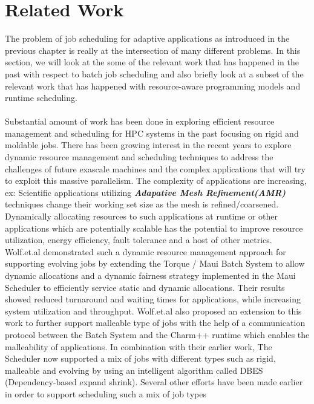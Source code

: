 \chapter{Related Work}\label{chapter:related work}
The problem of job scheduling for adaptive applications as introduced in the previous chapter is really at the intersection of many different problems. In this section, we will look at the some of the relevant work that has happened in the past with respect to batch job scheduling and also briefly look at a subset of the relevant work that has happened with resource-aware programming models and runtime scheduling.\\ \\
Substantial amount of work has been done in exploring efficient resource management and scheduling for HPC systems in the past focusing on rigid and moldable jobs. There has been growing interest in the recent years to explore dynamic resource management and scheduling techniques to address the challenges of future exascale machines and the complex applications that will try to exploit this massive parallelism. The complexity of applications are increasing, ex: Scientific applications utilizing \textbf{\textit{Adapative Mesh Refinement(AMR)}} techniques change their working set size as the mesh is refined/coarsened. Dynamically allocating resources to such applications at runtime or other applications which are potentially scalable has the potential to improve resource utilization, energy efficiency, fault tolerance\cite{vadhiyar} and a host of other metrics\cite{abhishek}\cite{osman}. Wolf.et.al\cite{felix} demonstrated such a dynamic resource management approach for supporting evolving jobs by extending the Torque / Maui Batch System to allow dynamic allocations and a dynamic fairness strategy implemented in the Maui Scheduler to efficiently service static and dynamic allocations. Their results showed reduced turnaround and waiting times for applications, while increasing system utilization and throughput. Wolf.et.al\cite{laxmikant} also proposed an extension to this work to further support malleable type of jobs with the help of a communication protocol between the Batch System and the Charm++ runtime which enables the malleability of applications. In combination with their earlier work, The Scheduler now supported a mix of jobs with different types such as rigid, malleable and evolving by using an intelligent algorithm called DBES (Dependency-based expand shrink). Several other efforts have been made earlier in order to support scheduling such a mix of job types\cite{hungershofer}\cite{jamjoom}\\ \\
